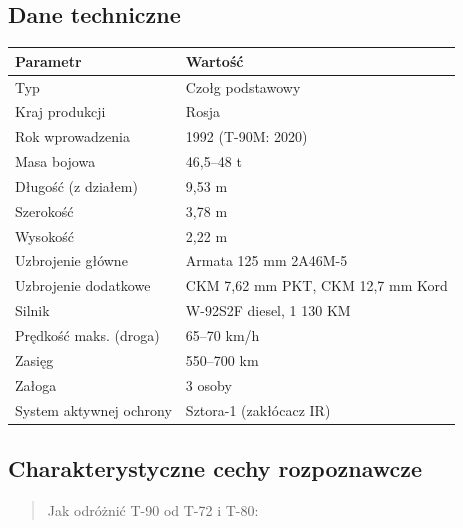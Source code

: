 \documentclass[12pt,oneside]{book}
\begin{document}
\subsection{Dane techniczne}\label{dane-techniczne-5}

\begin{longtable}[]{@{}ll@{}}
\toprule\noalign{}
Parametr & Wartość \\
\midrule\noalign{}
\endhead
\bottomrule\noalign{}
\endlastfoot
Typ & Czołg podstawowy \\
Kraj produkcji & Rosja \\
Rok wprowadzenia & 1992 (T-90M: 2020) \\
Masa bojowa & 46,5--48 t \\
Długość (z działem) & 9,53 m \\
Szerokość & 3,78 m \\
Wysokość & 2,22 m \\
Uzbrojenie główne & Armata 125 mm 2A46M-5 \\
Uzbrojenie dodatkowe & CKM 7,62 mm PKT, CKM 12,7 mm Kord \\
Silnik & W-92S2F diesel, 1 130 KM \\
Prędkość maks. (droga) & 65--70 km/h \\
Zasięg & 550--700 km \\
Załoga & 3 osoby \\
System aktywnej ochrony & Sztora-1 (zakłócacz IR) \\
\end{longtable}

\subsection{Charakterystyczne cechy
rozpoznawcze}\label{charakterystyczne-cechy-rozpoznawcze-5}

\begin{quote}
Jak odróżnić T-90 od T-72 i T-80:
\end{quote}
\end{document}
